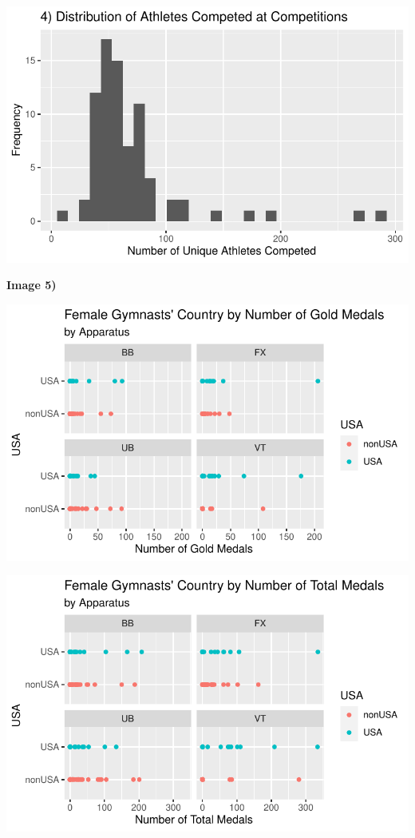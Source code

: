 \documentclass[
  letterpaper,
  DIV=11,
  numbers=noendperiod]{scrartcl}
\begin{document}
\includegraphics{Main_files/figure-pdf/unique-athletes-4.pdf}

\textbf{Image 5)}

\includegraphics{Main_files/figure-pdf/unnamed-chunk-4-1.pdf}

\includegraphics{Main_files/figure-pdf/unnamed-chunk-4-2.pdf}
\end{document}
